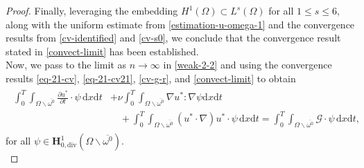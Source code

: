 \documentclass[a4paper,12pt,reqno,natbib]{amsart}
\newcommand{\dx} {\displaystyle\mathrm{d}x}
\newcommand{\dt} {\displaystyle\mathrm{d}t}
\def\H{\textbf{H}}
\begin{document}
\begin{proof}
\noindent Finally, leveraging the embedding  $H^1(\Omega)\subset L^s(\Omega)$ for all $1\leq s\leq 6,$ along with the uniform estimate from \eqref{estimation-u-omega-1} and the convergence results from \eqref{cv-identified} and \eqref{cv-s0}, we conclude that the convergence result stated in \eqref{convect-limit} has been established.\\


\noindent Now, we pass to the limit as $n\longrightarrow\infty$ in \eqref{weak-2-2} and using the convergence results \eqref{eq-21-cv}, \eqref{eq-21-cv21}, \eqref{cv-g-r}, and \eqref{convect-limit} to obtain
\begin{align}\label{weak-2-2-2}
\begin{split}
\displaystyle \int_0^T\int_{\Omega\backslash\overline{\omega^0}}\frac{\partial u^*}{\partial t}\cdot \psi \,\dx\dt&+\nu \int_0^T\int_{\Omega\backslash\overline{\omega^0}}\nabla u^* :\nabla \psi\dx\dt\\
&\quad+ \int_0^T\int_{\Omega\backslash\overline{\omega^0}} (u^*\cdot \nabla) u^* \cdot \psi\, \dx\dt=\int_0^T\int_{\Omega\backslash\overline{\omega^0}} \mathcal{G}\cdot \psi \,\dx\dt,
\end{split}
\end{align}
for all $\psi\in \H^1_{0,\text{div}}(\Omega\backslash\overline{\omega^0}).$ \\


\end{proof}
\end{document}
